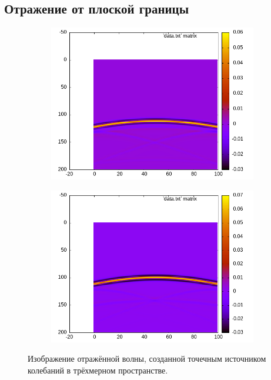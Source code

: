 \documentclass[a4paper, fontsize=14pt]{article}
\begin{document}
	\subsection{Отражение от плоской границы}
	
	
	\begin{figure}[h]
	\begin{subfigure}{.5\textwidth}
		\includegraphics[width=1\textwidth]{kflat0.png}
	\end{subfigure}
	\begin{subfigure}{.5\textwidth}
		\includegraphics[width=\textwidth]{kflat0.5.png}
	\end{subfigure}
	
	\caption{Изображение отражённой волны, созданной точечным источником колебаний в трёхмерном пространстве.   
	}
	\label{fig:kmodflatxt}
	\end{figure}
\end{document}
